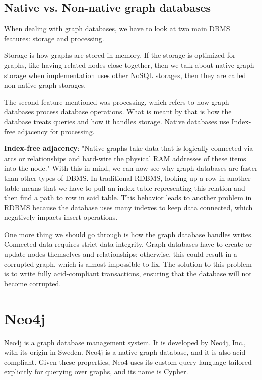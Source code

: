 \subsection {Native vs. Non-native graph databases}

When dealing with graph databases, we have to look at two main DBMS features: storage and processing.

Storage is how graphs are stored in memory. If the storage is optimized for graphs, like having related nodes close together, then we talk about native graph storage when implementation uses other NoSQL storages, then they are called non-native graph storages.

The second feature mentioned was processing, which refers to how graph databases process database operations. What is meant by that is how the database treats queries and how it handles storage. Native databases use Index-free adjacency for processing.
\cite{chao_graph_2018}

\textbf{Index-free adjacency}: "Native graphs take data that is logically connected via arcs or relationships and hard-wire the physical RAM addresses of these items into the node."
\cite{mccreary_neighborhood_2021} With this in mind, we can now see why graph databases are faster than other types of DBMS.
In traditional RDBMS, looking up a row in another table means that we have to pull an index table representing this relation and then find a path to row in said table.
This behavior leads to another problem in RDBMS because the database uses many indexes to keep data connected, which negatively impacts insert operations.

One more thing we should go through is how the graph database handles writes. Connected data requires strict data integrity.
Graph databases have to create or update nodes themselves and relationships; otherwise, this could result in a corrupted graph, which is almost impossible to fix.
The solution to this problem is to write fully \acrshort{acid}-compliant transactions, ensuring that the database will not become corrupted.
\cite{chao_graph_2018}

\section{Neo4j}

Neo4j is a graph database management system. It is developed by Neo4j, Inc., with its origin in Sweden. \cite{noauthor_company_nodate}
Neo4j is a native graph database, and it is also \acrshort{acid}-compliant. Given these properties, Neo4 uses its custom query language tailored explicitly for querying over graphs,
and its name is Cypher. \cite{noauthor_neo4j_nodate-2}

